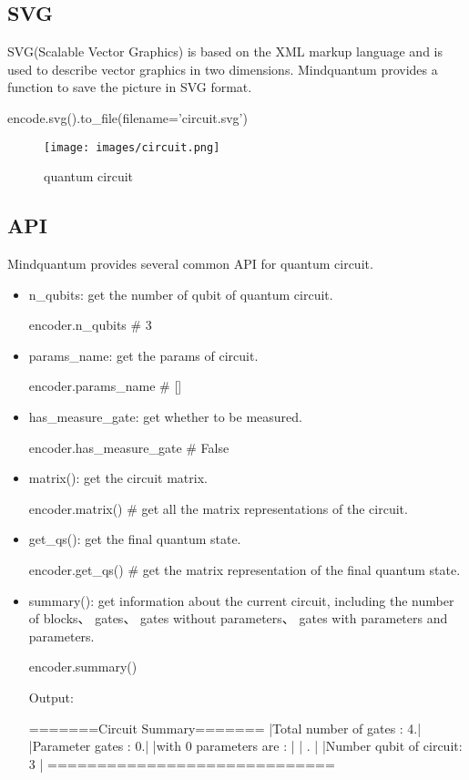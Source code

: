 \subsection{SVG}
SVG(Scalable Vector Graphics) is based on the XML markup language and is used to describe vector graphics in two dimensions. Mindquantum provides a function to save the picture in SVG format.
    \begin{python}
encode.svg().to\_file(filename='circuit.svg')
    \end{python}
    \begin{figure}[h]
       \begin{center}
            \texttt{[image: images/circuit.png]}
        \end{center}
        \caption{quantum circuit}
    \end{figure}
\subsection{API}
Mindquantum provides several common API for quantum circuit.
\begin{itemize}
    \item n\_qubits: get the number of qubit of quantum circuit.
    \begin{python}
encoder.n_qubits    # 3
    \end{python}
    \item params\_name: get the params of circuit.
    \begin{python}
encoder.params_name  # []
    \end{python}
    \item has\_measure\_gate: get whether to be measured.
    \begin{python}
encoder.has_measure_gate    # False
    \end{python}
    \item matrix(): get the circuit matrix.
    \begin{python}
encoder.matrix() 
# get all the matrix representations of the circuit.
    \end{python}
    \item get\_qs(): get the final quantum state.
    \begin{python}
encoder.get_qs()  
# get the matrix representation of the final quantum state.
    \end{python}
    \item summary(): get information about the current circuit, including the number of blocks、 gates、 gates without parameters、 gates with parameters and parameters.
    \begin{python}
encoder.summary()   
    \end{python}
Output:
\begin{python}
=======Circuit Summary=======
|Total number of gates  : 4.|
|Parameter gates        : 0.|
|with 0 parameters are  :   |
|                        .  |
|Number qubit of circuit: 3 |
=============================  
\end{python}
\end{itemize}
